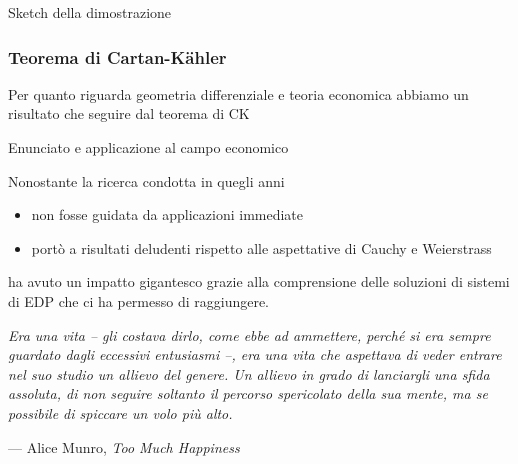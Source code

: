 \documentclass[serif,notheorems]{beamer}
\theoremstyle{definition} %
\theoremstyle{remark}
\begin{document}
\begin{frame}
Sketch della dimostrazione
\end{frame}

\begin{frame}
\frametitle{Teorema di Cartan-Kähler}
Per quanto riguarda geometria differenziale e teoria economica abbiamo un risultato che seguire dal teorema di CK

Enunciato e applicazione al campo economico
\end{frame}

\begin{frame}
Nonostante la ricerca condotta in quegli anni
\begin{itemize}
\item non fosse guidata da applicazioni immediate
\item portò a risultati deludenti rispetto alle aspettative di Cauchy e Weierstrass
\end{itemize}
ha avuto un impatto gigantesco grazie alla comprensione delle soluzioni di sistemi di EDP che ci ha permesso di raggiungere.
\end{frame}

\begin{frame}

\begin{center}
\textit{
Era una vita -- gli costava dirlo, come ebbe ad ammettere,
perché si era sempre guardato dagli eccessivi entusiasmi --, era una vita
che aspettava di veder entrare nel suo studio un allievo del genere. 
Un allievo in grado di lanciargli una sfida assoluta, 
di non seguire soltanto il percorso spericolato della sua mente, 
ma se possibile di spiccare un volo più alto.
}
\end{center}
\null\hfill --- Alice Munro, \textit{Too Much Happiness}
\end{frame}
\end{document}

